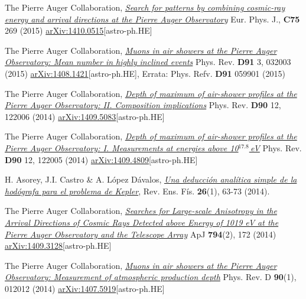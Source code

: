 \begin{etaremune}
\item {}The Pierre Auger Collaboration, \href{http://dx.doi.org/}{\emph{Search for patterns by combining cosmic-ray energy and arrival directions at the Pierre Auger Observatory}} Eur. Phys. J., {\bf{C75}} 269 (2015) \href{http://arxiv.org/abs/1410.0515}{arXiv:1410.0515}[astro-ph.HE]


\item {}The Pierre Auger Collaboration, \href{http://dx.doi.org/10.1103/PhysRevD.91.032003}{\emph{Muons in air showers at the Pierre Auger Observatory: Mean number in highly inclined events}} Phys. Rev. {\bf{D91}} 3, 032003 (2015) \href{http://arxiv.org/abs/1408.1421}{arXiv:1408.1421}[astro-ph.HE], Errata: Phys. Refv. {\bf{D91}} 059901 (2015)

\item {}The Pierre Auger Collaboration, \href{http://dx.doi.org/10.1103/PhysRevD.90.122006}{\emph{Depth of maximum of air-shower profiles at the Pierre Auger Observatory: II. Composition implications}} Phys. Rev. {\bf{D90}} 12, 122006 (2014) \href{http://arxiv.org/abs/1409.5083}{arXiv:1409.5083}[astro-ph.HE]

\item {}The Pierre Auger Collaboration, \href{http://dx.doi.org/10.1103/PhysRevD.90.122005}{\emph{Depth of maximum of air-shower profiles at the Pierre Auger Observatory: I. Measurements at energies above 10$^{17.8}$\,eV}} Phys. Rev. {\bf{D90}} 12, 122005 (2014) \href{http://arxiv.org/abs/1409.4809}{arXiv:1409.4809}[astro-ph.HE]

\item {}H. Asorey, J.I. Castro \& A. López Dávalos, \href{http://www.revistas.unc.edu.ar/index.php/revistaEF/article/view/9512}{\emph{Una deducción analítica simple de la hodógrafa para el problema de Kepler}}, Rev. Ens. Fís. {\bf{26}}(1), 63-73 (2014).

\item {}The Pierre Auger Collaboration, \href{http://dx.doi.org/10.1088/0004-637X/794/2/172}{\emph{Searches for Large-scale Anisotropy in the Arrival Directions of Cosmic Rays Detected above Energy of 1019 eV at the Pierre Auger Observatory and the Telescope Array}} ApJ {\bf{794}}(2), 172 (2014) \href{http://arxiv.org/abs/1409.3128}{arXiv:1409.3128}[astro-ph.HE]

\item {}The Pierre Auger Collaboration, \href{http://journals.aps.org/prd/abstract/10.1103/PhysRevD.90.012012}{\emph{Muons in air showers at the Pierre Auger Observatory: Measurement of atmospheric production depth}} Phys. Rev. D {\bf{90}}(1), 012012 (2014) \href{http://arxiv.org/abs/1407.5919}{arXiv:1407.5919}[astro-ph.HE]


\end{etaremune}
